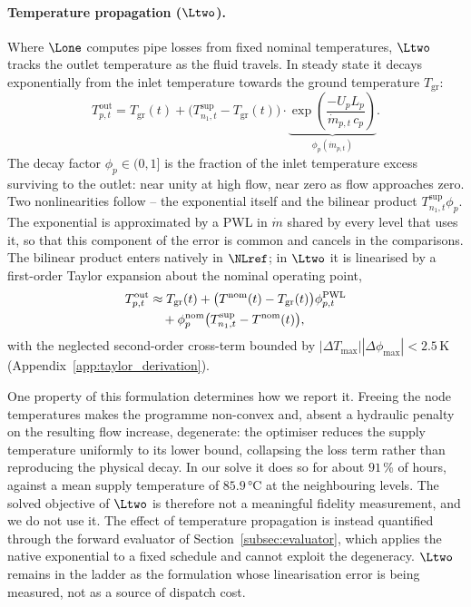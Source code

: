 \paragraph{Temperature propagation ($\Ltwo$).}
Where $\Lone$ computes pipe losses from fixed nominal temperatures, $\Ltwo$ tracks the
outlet temperature as the fluid travels. In steady state it decays exponentially from the
inlet temperature towards the ground temperature $T_{\mathrm{gr}}$:
%
\begin{equation}
  T_{p,t}^{\mathrm{out}} = T_{\mathrm{gr}}(t)
    + \bigl(T_{n_1,t}^{\mathrm{sup}} - T_{\mathrm{gr}}(t)\bigr)
    \cdot \underbrace{\exp\!\left(
      \frac{-U_p L_p}{\dot{m}_{p,t}\, c_p}
    \right)}_{\displaystyle\phi_p(\dot{m}_{p,t})}.
  \label{eq:temp_prop}
\end{equation}
%
The decay factor $\phi_p \in (0,1]$ is the fraction of the inlet temperature excess
surviving to the outlet: near unity at high flow, near zero as flow approaches zero. Two
nonlinearities follow -- the exponential itself and the bilinear product
$T_{n_1,t}^{\mathrm{sup}} \phi_p$. The exponential is approximated by a PWL in $\dot{m}$
shared by every level that uses it, so that this component of the error is common and
cancels in the comparisons. The bilinear product enters natively in $\NLref$; in $\Ltwo$
it is linearised by a first-order Taylor expansion about the nominal operating point,
%
\begin{align}
  T_{p,t}^{\mathrm{out}} &\approx T_{\mathrm{gr}}(t)
    + \bigl(T^{\mathrm{nom}}(t) - T_{\mathrm{gr}}(t)\bigr)
      \phi_{p,t}^{\mathrm{PWL}} \notag \\
    &\quad + \phi_p^{\mathrm{nom}}
      \bigl(T_{n_1,t}^{\mathrm{sup}} - T^{\mathrm{nom}}(t)\bigr),
  \label{eq:temp_prop_lin}
\end{align}
%
with the neglected second-order cross-term bounded by
$|\Delta T_{\max}||\Delta\phi_{\max}| < 2.5$\,K (Appendix~\ref{app:taylor_derivation}).

One property of this formulation determines how we report it. Freeing the node
temperatures makes the programme non-convex and, absent a hydraulic penalty on the
resulting flow increase, degenerate: the optimiser reduces the supply temperature
uniformly to its lower bound, collapsing the loss term rather than reproducing the
physical decay. In our solve it does so for about $91$\,\% of hours, against a mean
supply temperature of $85.9$\,°C at the neighbouring levels. The solved objective of
$\Ltwo$ is therefore not a meaningful fidelity measurement, and we do not use it. The
effect of temperature propagation is instead quantified through the forward evaluator of
Section~\ref{subsec:evaluator}, which applies the native exponential to a fixed schedule
and cannot exploit the degeneracy. $\Ltwo$ remains in the ladder as the formulation whose
linearisation error is being measured, not as a source of dispatch cost.

